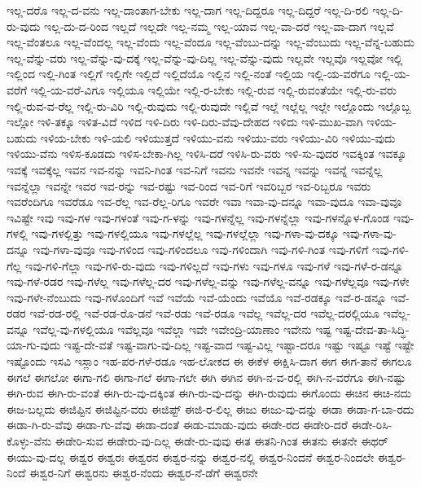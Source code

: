 {ಇಲ್ಲ-ದರೊ
ಇಲ್ಲ-ದ-ವನು
ಇಲ್ಲ-ದಾಂತಾಗ-ಬೇಕು
ಇಲ್ಲ-ದಾಗ
ಇಲ್ಲ-ದಿದ್ದರೂ
ಇಲ್ಲ-ದಿದ್ದರೆ
ಇಲ್ಲ-ದಿ-ರಲಿ
ಇಲ್ಲ-ದಿ-ರು-ವುದು
ಇಲ್ಲ-ದು-ದ-ರಿಂದ
ಇಲ್ಲದೆ
ಇಲ್ಲದೇ
ಇಲ್ಲ-ನಮ್ಮ
ಇಲ್ಲ-ಯಾವ
ಇಲ್ಲ-ವಾ-ದರೆ
ಇಲ್ಲ-ವಾ-ದಾಗ
ಇಲ್ಲವೆ
ಇಲ್ಲ-ವೆಂತಲೂ
ಇಲ್ಲ-ವೆಂದಲ್ಲ
ಇಲ್ಲ-ವೆಂದು
ಇಲ್ಲ-ವೆಂದೂ
ಇಲ್ಲ-ವೆಂಬು-ದನ್ನು
ಇಲ್ಲ-ವೆಂಬುದು
ಇಲ್ಲ-ವೆನ್ನ-ಬಹುದು
ಇಲ್ಲ-ವೆನ್ನು-ವರು
ಇಲ್ಲ-ವೆನ್ನು-ವು-ದಕ್ಕೆ
ಇಲ್ಲ-ವೆನ್ನು-ವು-ದಿಲ್ಲ
ಇಲ್ಲ-ವೆನ್ನು-ವುದು
ಇಲ್ಲವೇ
ಇಲ್ಲವೊ
ಇಲ್ಲವೋ
ಇಲ್ಲಿ
ಇಲ್ಲಿಂದ
ಇಲ್ಲಿ-ಗಿಂತ
ಇಲ್ಲಿಗೆ
ಇಲ್ಲಿಗೇ
ಇಲ್ಲಿದೆ
ಇಲ್ಲಿದೆಯೊ
ಇಲ್ಲಿನ
ಇಲ್ಲಿ-ನಂತೆ
ಇಲ್ಲಿಯ
ಇಲ್ಲಿ-ಯ-ವರೆಗೂ
ಇಲ್ಲಿ-ಯ-ವರೆಗೆ
ಇಲ್ಲಿ-ಯ-ವರೆ-ವಿಗೂ
ಇಲ್ಲಿಯೂ
ಇಲ್ಲಿಯೇ
ಇಲ್ಲಿ-ರ-ಬೇಕು
ಇಲ್ಲಿ-ರುವ
ಇಲ್ಲಿ-ರುವಂತೆಯೇ
ಇಲ್ಲಿ-ರು-ವರು
ಇಲ್ಲಿ-ರುವ-ವ-ರೆಲ್ಲ
ಇಲ್ಲಿ-ರು-ವಿರಿ
ಇಲ್ಲಿ-ರುವುದು
ಇಲ್ಲಿ-ರುವುದೇ
ಇಲ್ಲಿವೆ
ಇಲ್ಲೆ
ಇಲ್ಲೆಲ್ಲ
ಇಲ್ಲೇ
ಇಲ್ಲೊಂದು
ಇಲ್ಲೊಬ್ಬ
ಇಲ್ಲೋ
ಇಳಿ-ತಕ್ಕೂ
ಇಳಿತ-ವಿದೆ
ಇಳಿದ
ಇಳಿ-ದಿರು
ಇಳಿ-ದಿರು-ವೆವು-ದೇಹದ
ಇಳಿದು
ಇಳಿ-ಮುಖ-ವಾಗಿ
ಇಳಿಯ-ಬಹುದು
ಇಳಿಯ-ಬೇಕು
ಇಳಿ-ಯಲಿ
ಇಳಿಯುತ್ತದೆ
ಇಳಿಯು-ವನು
ಇಳಿಯು-ವರು
ಇಳಿಯು-ವಿರಿ
ಇಳಿಯು-ವುದು
ಇಳಿಯು-ವೆನು
ಇಳಿಸ-ಕೂಡದು
ಇಳಿಸ-ಬೇಕಾ-ಗಿಲ್ಲ
ಇಳಿಸಿ-ದರೆ
ಇಳಿಸಿ-ರು-ವರು
ಇಳಿ-ಸು-ವುದರ
ಇವಕ್ಕಿಂತ
ಇವಕ್ಕೂ
ಇವಕ್ಕೆ
ಇವಕ್ಕೆಲ್ಲ
ಇವನ
ಇವ-ನನ್ನು
ಇವನಿ-ಗಿಂತ
ಇವ-ನಿಗೆ
ಇವನು
ಇವನೇ
ಇವನ್ನ
ಇವನ್ನು
ಇವನ್ನೆ
ಇವನ್ನೆಲ್ಲ
ಇವನ್ನೆಲ್ಲಾ
ಇವನ್ನೇ
ಇವರ
ಇವ-ರನ್ನು
ಇವ-ರಷ್ಟು
ಇವ-ರಿಂದ
ಇವ-ರಿಗೆ
ಇವರಿಬ್ಬರ
ಇವ-ರಿಬ್ಬರೂ
ಇವರು
ಇವರೆಂದಿಗೂ
ಇವರೆಡೂ
ಇವ-ರೆಲ್ಲ
ಇವ-ರೆಲ್ಲ-ರಿಗೂ
ಇವರೇ
ಇವಾ
ಇವಾ-ವು-ದನ್ನೂ
ಇವಾ-ವುದೂ
ಇವಾ-ವುವೂ
ಇವಿಷ್ಟೇ
ಇವು
ಇವು-ಗಳ
ಇವು-ಗಳಂತೆ
ಇವು-ಗ-ಳನ್ನು
ಇವು-ಗಳನ್ನೆಲ್ಲ
ಇವು-ಗಳನ್ನೆಲ್ಲಾ
ಇವು-ಗಳನ್ನೊಳ-ಗೊಂಡ
ಇವು-ಗಳಲ್ಲಿ
ಇವು-ಗಳಲ್ಲಿತ್ತು
ಇವು-ಗಳಲ್ಲಿಯೂ
ಇವು-ಗಳಲ್ಲೆಲ್ಲ
ಇವು-ಗಳಲ್ಲೆಲ್ಲಾ
ಇವು-ಗಳಾ-ವು-ದಕ್ಕೂ
ಇವು-ಗಳಾ-ವು-ದನ್ನೂ
ಇವು-ಗಳಾ-ವುವೂ
ಇವು-ಗಳಿಂದ
ಇವು-ಗಳಿಂದಲೂ
ಇವು-ಗಳಿಂದಾಗಿ
ಇವು-ಗಳಿ-ಗಿಂತ
ಇವು-ಗಳಿಗೆ
ಇವು-ಗಳಿ-ಗೆಲ್ಲ
ಇವು-ಗಳಿ-ಗೆಲ್ಲಾ
ಇವು-ಗಳಿ-ರು-ವುದು
ಇವು-ಗಳಿಲ್ಲದೆ
ಇವು-ಗಳು
ಇವು-ಗಳೂ
ಇವು-ಗಳೆ
ಇವು-ಗಳೆ-ರ-ಡನ್ನೂ
ಇವು-ಗಳೆ-ರಡರ
ಇವು-ಗಳೆಲ್ಲ
ಇವು-ಗಳೆಲ್ಲ-ದರ
ಇವು-ಗಳೆಲ್ಲ-ವನ್ನು
ಇವು-ಗಳೆಲ್ಲ-ವನ್ನೂ
ಇವು-ಗಳೆಲ್ಲವೂ
ಇವು-ಗಳೇ
ಇವು-ಗಳೇ-ನೆಂಬುದು
ಇವು-ಗಳೊಂದಿಗೆ
ಇವೆ
ಇವೆಯೆ
ಇವೆ-ಯೆಂದು
ಇವೆಯೊ
ಇವೆ-ರಡಕ್ಕೂ
ಇವೆ-ರ-ಡನ್ನೂ
ಇವೆ-ರಡರ
ಇವೆ-ರಡ-ರಲ್ಲಿ
ಇವೆ-ರಡ-ರೊ-ಡನೆ
ಇವೆ-ರಡು
ಇವೆ-ರಡೂ
ಇವೆಲ್ಲ
ಇವೆಲ್ಲ-ದರ
ಇವೆಲ್ಲ-ದರಲ್ಲಿಯೂ
ಇವೆಲ್ಲ-ವನ್ನೂ
ಇವೆಲ್ಲ-ವು-ಗಳಲ್ಲಿಯೂ
ಇವೆಲ್ಲವೂ
ಇವೆಲ್ಲಾ
ಇವೇ
ಇವೇಂದ್ರಿ-ಯಾಣಾಂ
ಇವೇನು
ಇಷ್ಟ
ಇಷ್ಟ-ದೇವ-ತಾ-ಸಿದ್ಧಿ-ಯಾ-ಗು-ವುದು
ಇಷ್ಟ-ದೇ-ವತೆ
ಇಷ್ಟ-ವಾಗು-ವು-ದಿಲ್ಲ
ಇಷ್ಟ-ವಾದ
ಇಷ್ಟ-ವಿಲ್ಲ
ಇಷ್ಟಾ-ದರೂ
ಇಷ್ಟು
ಇಷ್ಟೂ
ಇಷ್ಟೆ
ಇಷ್ಟೇ
ಇಷ್ಟೊಂದು
ಇಸವಿ
ಇಸ್ಲಾಂ
ಇಹ-ಪರ-ಗಳೆ-ರಡೂ
ಇಹ-ಲೋಕದ
ಈ
ಈಕೆಳ
ಈಕ್ಷಿಸಿ-ದಾಗ
ಈಗ
ಈಗ-ತಾನೆ
ಈಗಲೂ
ಈಗಲೆ
ಈಗಲೋ
ಈಗಾ-ಗಲಿ
ಈಗಾ-ಗಲೆ
ಈಗಾ-ಗಲೇ
ಈಗಿ
ಈಗಿನ
ಈಗಿ-ನ-ವ-ರಲ್ಲಿ
ಈಗಿ-ನ-ವರೆಗೂ
ಈಗಿ-ನಷ್ಟು
ಈಗಿ-ರುವ
ಈಗಿ-ರು-ವಂತೆ
ಈಗಿ-ರು-ವು-ದಕ್ಕಿಂತ
ಈಗಿ-ರು-ವು-ದನ್ನು
ಈಗಿ-ರುವುದು
ಈಗೊಂದು
ಈಚಿನ
ಈಚಿ-ನದು
ಈಜ-ಬಲ್ಲದು
ಈಜಿಪ್ಟಿನ
ಈಜಿಪ್ಟಿನ-ವರು
ಈಜಿಪ್ಟ್
ಈಜಿ-ರ-ಲಿಲ್ಲ
ಈಜು
ಈಜು-ವು-ದನ್ನು
ಈಡಾ
ಈಡಾ-ಗ-ಬಾ-ರದು
ಈಡಾ-ಗಿ-ರು-ವೆವು
ಈಡಾ-ಗು-ವೆವು
ಈಡಾ-ದಂತೆ
ಈಡು-ಮಾಡು-ವುದು
ಈಡೇ-ರದ
ಈಡೇರಿ-ದರೆ
ಈಡೇ-ರಿಸಿ-ಕೊಳ್ಳು-ವೆನು
ಈಡೇರಿ-ಸುವ
ಈಡೇರು-ವು-ದಿಲ್ಲ
ಈಡೇ-ರು-ವುವು
ಈತ
ಈತನಿ-ಗಿಂತ
ಈತನು
ಈತನೇ
ಈಥರ್
ಈಯು-ವು-ದಲ್ಲ
ಈಶ್ವರ
ಈಶ್ವರಃ
ಈಶ್ವರನ
ಈಶ್ವರ-ನನ್ನು
ಈಶ್ವರ-ನಲ್ಲಿ
ಈಶ್ವರ-ನಿಂದನೆ
ಈಶ್ವರ-ನಿಂದಲೇ
ಈಶ್ವರ-ನಿಂದೆ
ಈಶ್ವರ-ನಿಗೆ
ಈಶ್ವರನು
ಈಶ್ವರ-ನೆಂದು
ಈಶ್ವರ-ನೆ-ಡೆಗೆ
ಈಶ್ವರನೇ
}
